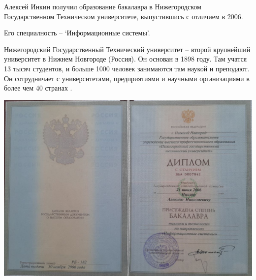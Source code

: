 
Алексей Инкин получил образование бакалавра в Нижегородском Государственном Техническом университете,
выпустившись с отличием в 2006.

Его специалность -- `Информационные системы'.

Нижегородский Государственный Технический университет -- второй крупнейший университет в Нижнем Новгороде (Россия).
Он основан в 1898 году.
Там учатся 13 тысяч студентов, и больше 1000 человек занимаются там наукой и преподают.
Он сотрудничает с университетами, предприятиями и научными организациями в более чем 40 странах
.



\begin{center}
    \includegraphics[width=57em,angle=90]{title}
\end{center}
\pagebreak

